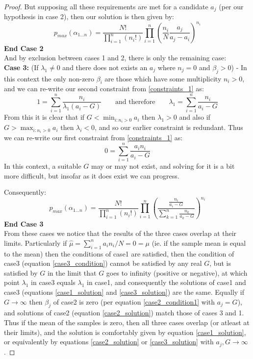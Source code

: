 \documentclass[12pt]{colt2020} %
\begin{document}
\begin{proof}
But supposing all these requirements are met for a candidate $a_j$ (per our hypothesis in case 2), then our solution is then given by:
\begin{equation}\label{case2_solution}p_{max}(\alpha_{1\dots n}) = \frac{N!}{\prod_{i=1}^n(n_i!)}\prod_{i=1}^n \left(\frac{n_i}{N}\frac{a_j}{a_j-a_i}\right)^{n_i} \end{equation}
\textbf{End Case 2}\\

And by exclusion between cases 1 and 2, there is only the remaining case:\\

\textbf{Case 3:} (If $\lambda_1\ne 0$ and there does not exists an $a_j$ where $n_j=0$ and $\beta_j>0$) -
In this context the only non-zero $\beta_i$ are those which have some multiplicity $n_i>0$, and we can re-write our second constraint from \eqref{constraints_1} as:
$$ 1 = \sum_{i=1}^n\frac{n_i}{\lambda_1(a_i-G)} \quad\quad\text{and therefore}\quad\quad \lambda_1 = \sum_{i=1}^n\frac{n_i}{a_i-G}$$
From this it is clear that if $G<\min_{i:n_i>0}a_i$ then $\lambda_1>0$ and also if $G>\max_{i:n_i>0}a_i$ then $\lambda_i<0$, and so our earlier constraint is redundant.
Thus we can re-write our first constraint from \eqref{constraints_1} as:
\begin{equation}\label{case3_condition} 0 = \sum_{i=1}^n \frac{a_in_i}{a_i-G} \end{equation}
In this context, a suitable $G$ may or may not exist, and solving for it is a bit more difficult, but insofar as it does exist we can progress.

Consequently:
\begin{equation}\label{case3_solution}p_{max}(\alpha_{1\dots n}) = \frac{N!}{\prod_{i=1}^n(n_i!)}\prod_{i=1}^n \left(\frac{\frac{n_i}{a_i-G}}{\sum_{k=1}^n\frac{n_k}{a_k-G}}\right)^{n_i} \end{equation}
\textbf{End Case 3}\\

From these cases we notice that the results of the three cases overlap at their limits.
Particularly if $\hat{\mu}=\sum_{i=1}^na_in_i/N = 0=\mu$ (ie. if the sample mean is equal to the mean) then the conditions of case1 are satisfied, then the condition of case3 (equation \ref{case3_condition}) cannot be satisfied by any real $G$, but is satisfied by $G$ in the limit that $G$ goes to infinity (positive or negative), at which point $\lambda_1$ in case3 equals $\lambda_1$ in case1, and consequently the solutions of case1 and case3 (equations \ref{case1_solution} and \ref{case3_solution}) are the same.
Equally if $G\rightarrow \infty$ then $\beta_j$ of case2 is zero (per equation \ref{case2_condition1} with $a_j=G$), and solutions of case2 (equation \ref{case2_solution}) match those of cases 3 and 1.
Thus if the mean of the samples is zero, then all three cases overlap (or atleast at their limits), and the solution is comfortably given by equation \eqref{case1_solution}, or equivalently by equations \ref{case2_solution} or \ref{case3_solution} with $a_j,G\rightarrow \infty$.


\end{proof}
\end{document}
